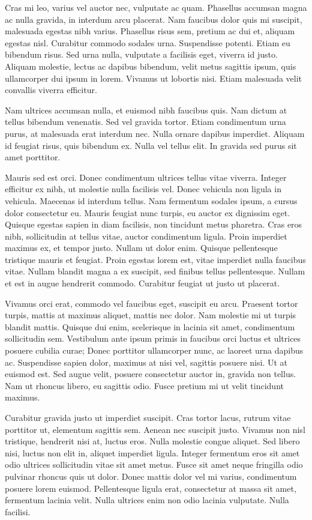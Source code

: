 \documentclass{homework}
\begin{document}
Cras mi leo, varius vel auctor nec, vulputate ac quam. Phasellus accumsan magna ac nulla gravida, in interdum arcu placerat. Nam faucibus dolor quis mi suscipit, malesuada egestas nibh varius. Phasellus risus sem, pretium ac dui et, aliquam egestas nisl. Curabitur commodo sodales urna. Suspendisse potenti. Etiam eu bibendum risus. Sed urna nulla, vulputate a facilisis eget, viverra id justo. Aliquam molestie, lectus ac dapibus bibendum, velit metus sagittis ipsum, quis ullamcorper dui ipsum in lorem. Vivamus ut lobortis nisi. Etiam malesuada velit convallis viverra efficitur.

Nam ultrices accumsan nulla, et euismod nibh faucibus quis. Nam dictum at tellus bibendum venenatis. Sed vel gravida tortor. Etiam condimentum urna purus, at malesuada erat interdum nec. Nulla ornare dapibus imperdiet. Aliquam id feugiat risus, quis bibendum ex. Nulla vel tellus elit. In gravida sed purus sit amet porttitor.

Mauris sed est orci. Donec condimentum ultrices tellus vitae viverra. Integer efficitur ex nibh, ut molestie nulla facilisis vel. Donec vehicula non ligula in vehicula. Maecenas id interdum tellus. Nam fermentum sodales ipsum, a cursus dolor consectetur eu. Mauris feugiat nunc turpis, eu auctor ex dignissim eget. Quisque egestas sapien in diam facilisis, non tincidunt metus pharetra. Cras eros nibh, sollicitudin at tellus vitae, auctor condimentum ligula. Proin imperdiet maximus ex, et tempor justo. Nullam ut dolor enim. Quisque pellentesque tristique mauris et feugiat. Proin egestas lorem est, vitae imperdiet nulla faucibus vitae. Nullam blandit magna a ex suscipit, sed finibus tellus pellentesque. Nullam et est in augue hendrerit commodo. Curabitur feugiat ut justo ut placerat.

Vivamus orci erat, commodo vel faucibus eget, suscipit eu arcu. Praesent tortor turpis, mattis at maximus aliquet, mattis nec dolor. Nam molestie mi ut turpis blandit mattis. Quisque dui enim, scelerisque in lacinia sit amet, condimentum sollicitudin sem. Vestibulum ante ipsum primis in faucibus orci luctus et ultrices posuere cubilia curae; Donec porttitor ullamcorper nunc, ac laoreet urna dapibus ac. Suspendisse sapien dolor, maximus at nisi vel, sagittis posuere nisi. Ut at euismod est. Sed augue velit, posuere consectetur auctor in, gravida non tellus. Nam ut rhoncus libero, eu sagittis odio. Fusce pretium mi ut velit tincidunt maximus.

Curabitur gravida justo ut imperdiet suscipit. Cras tortor lacus, rutrum vitae porttitor ut, elementum sagittis sem. Aenean nec suscipit justo. Vivamus non nisl tristique, hendrerit nisi at, luctus eros. Nulla molestie congue aliquet. Sed libero nisi, luctus non elit in, aliquet imperdiet ligula. Integer fermentum eros sit amet odio ultrices sollicitudin vitae sit amet metus. Fusce sit amet neque fringilla odio pulvinar rhoncus quis ut dolor. Donec mattis dolor vel mi varius, condimentum posuere lorem euismod. Pellentesque ligula erat, consectetur at massa sit amet, fermentum lacinia velit. Nulla ultrices enim non odio lacinia vulputate. Nulla facilisi.
\end{document}
